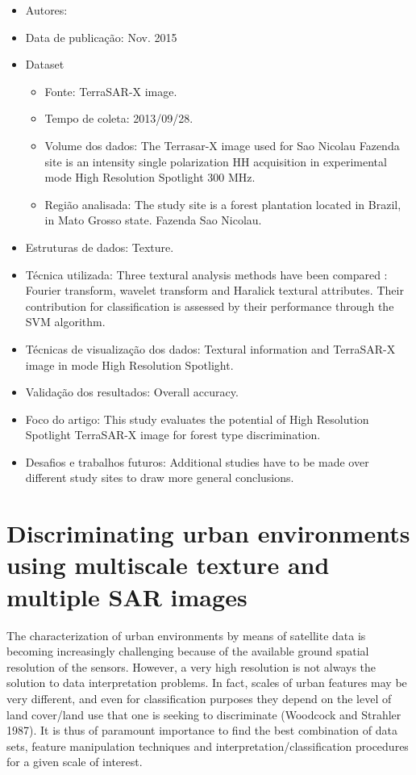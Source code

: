 \documentclass[paper=a4, fontsize=11pt]{scrartcl}
\begin{document}
\begin{itemize}
    \item Autores:~\cite{cazals2015contribution}
    \item Data de publicação: Nov. 2015
    \item Dataset
    \begin{itemize}
        \item Fonte: TerraSAR-X image.
        \item Tempo de coleta: 2013/09/28.
        \item Volume dos dados: The Terrasar-X image used for Sao Nicolau Fazenda site is an intensity single polarization HH acquisition in experimental mode High Resolution Spotlight 300 MHz.
        \item Região analisada: The study site is a forest plantation located in Brazil, in Mato Grosso state. Fazenda Sao Nicolau.
    \end{itemize}
    \item Estruturas de dados: Texture.
    \item Técnica utilizada: Three textural analysis methods have been compared : Fourier transform, wavelet transform and Haralick textural attributes. Their contribution for classification is assessed by their performance through the SVM algorithm.
    \item Técnicas de visualização dos dados: Textural information and TerraSAR-X image in mode High Resolution Spotlight.
    \item Validação dos resultados: Overall accuracy.
    \item Foco do artigo: This study evaluates the potential of High Resolution Spotlight TerraSAR-X image for forest type discrimination.
    \item Desafios e trabalhos futuros: Additional studies have to be made over different study sites to draw more general conclusions.
\end{itemize}

\newpage

\section*{\textcolor{VioletRed4}{Discriminating urban environments using multiscale texture and multiple SAR images}}

The characterization of urban environments by means of satellite data is becoming increasingly challenging because of the available ground spatial resolution of the sensors. 
However, a very high resolution is not always the solution to data interpretation problems. 
In fact, scales of urban features may be very different, and even for classification purposes they depend on the level of land cover/land use that one is seeking to discriminate (Woodcock and Strahler 1987). 
It is thus of paramount importance to find the best combination of data sets, feature manipulation techniques and interpretation/classification procedures for a given scale of interest.
\end{document}

